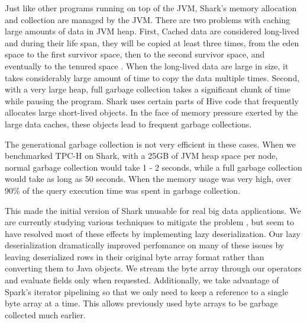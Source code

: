 Just like other programs running on top of the JVM, Shark's memory allocation and collection are managed by the JVM. There are two problems with caching large amounts of data in JVM heap. First, Cached data are considered long-lived and during their life span, they will be copied at least three times, from the eden space to the first survivor space, then to the second survivor space, and eventually to the tenured space \cite{jvm-gc}. When the long-lived data are large in size, it takes considerably large amount of time to copy the data multiple times. Second, with a very large heap, full garbage collection takes a significant chunk of time while pausing the program. Shark uses certain parts of Hive code that frequently allocates large short-lived objects. In the face of memory pressure exerted by the large data caches, these objects lead to frequent garbage collections.

The generational garbage collection is not very efficient in these cases. When we benchmarked TPC-H on Shark, with a 25GB of JVM heap space per node, normal garbage collection would take 1 - 2 seconds, while a full garbage collection would take as long as 50 seconds. When the memory usage was very high, over 90\% of the query execution time was spent in garbage collection.

This made the initial version of Shark unusable for real big data applications. We are currently studying various techniques to mitigate the problem \cite{hbase-gc}, but seem to have resolved most of these effects by implementing lazy deserialization. Our lazy deserialization dramatically improved perfomance on many of these issues by leaving deserialized rows in their original byte array format rather than converting them to Java objects. We stream the byte array through our operators and evaluate fields only when requested. Additionally, we take advantage of Spark's iterator pipelining so that we only need to keep a reference to a single byte array at a time. This allows previously used byte arrays to be garbage collected much earlier.



